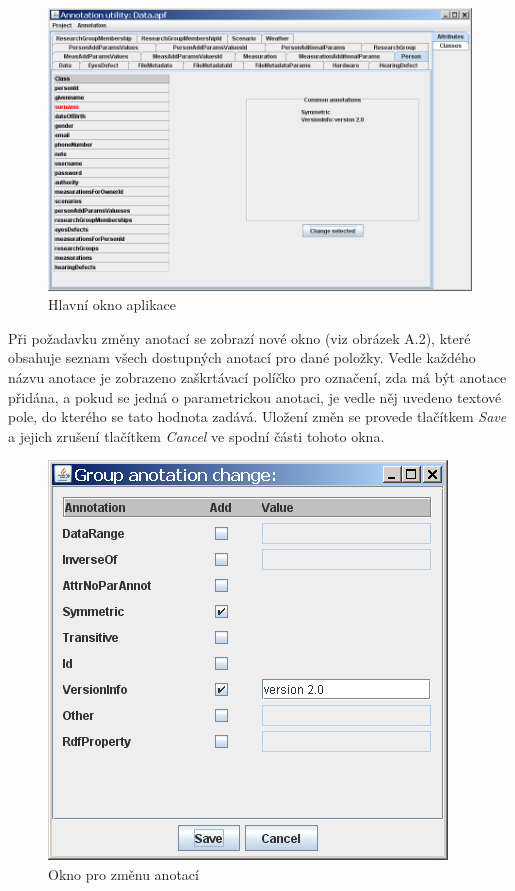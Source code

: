 \documentclass{projekt}
\begin{document}
\begin{figure}[htb!]
\begin{center}
\includegraphics[scale=0.5]{Hlavni.png}
\caption{Hlavní okno aplikace}
\end{center}
\end{figure}


Při požadavku změny anotací se zobrazí nové okno (viz obrázek A.2), které obsahuje seznam všech dostupných anotací pro dané položky. Vedle každého názvu anotace je zobrazeno zaškrtávací políčko pro označení, zda má být anotace přidána, a pokud se jedná o parametrickou anotaci, je vedle něj uvedeno textové pole, do kterého se tato hodnota zadává. Uložení změn se provede tlačítkem {\it Save} a jejich zrušení tlačítkem {\it Cancel} ve spodní části tohoto okna.

\vspace{0.1cm}
\begin{figure}[htb!]
\begin{center}
\includegraphics[scale=0.5]{Nastav.png}
\caption{Okno pro změnu anotací}
\end{center}
\end{figure}
\end{document}
